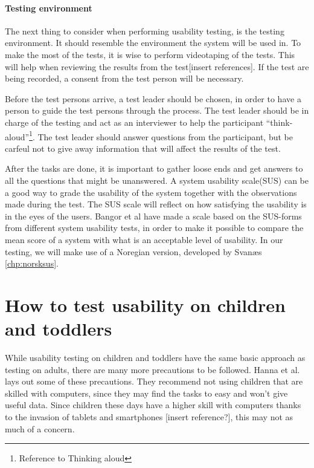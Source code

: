 \paragraph{Testing environment}
\label{par:testingenvironment}
The next thing to consider when performing usability testing, is the testing environment. It should resemble the environment the system will be used in. To make the most of the tests, it is wise to perform videotaping of the tests. This will help when reviewing the results from the test[insert references]. If the test are being recorded, a consent from the test person will be necessary.

Before the test persons arrive, a test leader should be chosen, in order to have a person to guide the test persons through the process. The test leader should be in charge of the testing and act as an interviewer to help the participant ``think-aloud''\footnote{Reference to Thinking aloud}. The test leader should answer questions from the participant, but be carfeul not to give away information that will affect the results of the test.

After the tasks are done, it is important to gather loose ends and get answers to all the questions that might be unanswered. A system usability scale(SUS)\cite{sus} can be a good way to grade the usability of the system together with the observations made during the test. The SUS scale will reflect on how satisfying the usability is in the eyes of the users. Bangor et al \cite{susform} have made a scale based on the SUS-forms from different system usability tests, in order to make it possible to compare the mean score of a system with what is an acceptable level of usability. In our testing, we will make use of a Noregian version, developed by Svanæs \ref{chp:norsksus}.

\section{How to test usability on children and toddlers}
While usability testing on children and toddlers have the same basic approach as testing on adults, there are many more precautions to be followed. 
Hanna et al. \cite{testingenvironmentforchildren} lays out some of these precautions. They recommend not using children that are skilled with computers, since they may find the tasks to easy and won't give useful data. 
Since children these days have a higher skill with computers thanks to the invasion of tablets and smartphones [insert reference?], this may not as much of a concern. 

